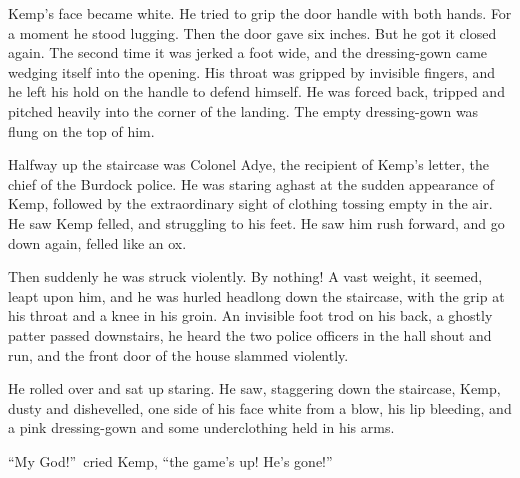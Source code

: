 Kemp’s face became white. He tried to grip the door handle with both hands. For a moment he stood lugging. Then the door gave six inches. But he got it closed again. The second time it was jerked a foot wide, and the dressing-gown came wedging itself into the opening. His throat was gripped by invisible fingers, and he left his hold on the handle to defend himself. He was forced back, tripped and pitched heavily into the corner of the landing. The empty dressing-gown was flung on the top of him.

Halfway up the staircase was Colonel Adye, the recipient of Kemp’s letter, the chief of the Burdock police. He was staring aghast at the sudden appearance of Kemp, followed by the extraordinary sight of clothing tossing empty in the air. He saw Kemp felled, and struggling to his feet. He saw him rush forward, and go down again, felled like an ox.

Then suddenly he was struck violently. By nothing! A vast weight, it seemed, leapt upon him, and he was hurled headlong down the staircase, with the grip at his throat and a knee in his groin. An invisible foot trod on his back, a ghostly patter passed downstairs, he heard the two police officers in the hall shout and run, and the front door of the house slammed violently.

He rolled over and sat up staring. He saw, staggering down the staircase, Kemp, dusty and dishevelled, one side of his face white from a blow, his lip bleeding, and a pink dressing-gown and some underclothing held in his arms.

“My God!”\ cried Kemp, “the game’s up! He’s gone!”